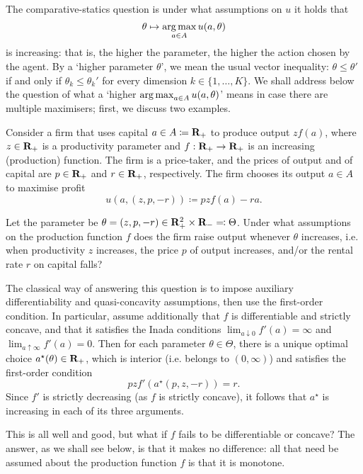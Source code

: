 The comparative-statics question is under what assumptions on $u$ it holds that
%
\begin{equation*}
	\theta \mapsto \operatorname*{arg\,max}_{a \in A} u(a,\theta)
\end{equation*}
%
is increasing: that is, the higher the parameter, the higher the action chosen by the agent. By a `higher parameter $\theta$', we mean the usual vector inequality: $\theta \leq \theta'$ if and only if $\theta_k \leq \theta_k'$ for every dimension $k \in \{1,\dots,K\}$. We shall address below the question of what a `higher $\operatorname*{arg\,max}_{a \in A} u(a,\theta)$' means in case there are multiple maximisers; first, we discuss two examples.

\begin{example}
	\label{example:prod}
	Consider a firm that uses capital $a \in A \coloneqq \mathbf{R}_+$ to produce output $z f(a)$, where $z \in \mathbf{R}_+$ is a productivity parameter and $f : \mathbf{R}_+ \to \mathbf{R}_+$ is an increasing (production) function. The firm is a price-taker, and the prices of output and of capital are $p \in \mathbf{R}_+$ and $r \in \mathbf{R}_+$, respectively. The firm chooses its output $a \in A$ to maximise profit
	\begin{equation*}
		u(a,(z,p,-r)) \coloneqq pzf(a) - ra .
	\end{equation*}
	
	Let the parameter be $\theta = (z,p,-r) \in \mathbf{R}_+^2 \times \mathbf{R}_- \eqqcolon \Theta$. Under what assumptions on the production function $f$ does the firm raise output whenever $\theta$ increases, i.e. when productivity $z$ increases, the price $p$ of output increases, and/or the rental rate $r$ on capital falls?
	
	The classical way of answering this question is to impose auxiliary differentiability and quasi-concavity assumptions, then use the first-order condition. In particular, assume additionally that $f$ is differentiable and strictly concave, and that it satisfies the Inada conditions $\lim_{a \downarrow 0} f'(a) = \infty$ and $\lim_{a \uparrow \infty} f'(a) = 0$. Then for each parameter $\theta \in \Theta$, there is a unique optimal choice $a^\star(\theta) \in \mathbf{R}_+$, which is interior (i.e. belongs to $(0,\infty)$) and satisfies the first-order condition
	\begin{equation*}
		pzf'\left(a^\star(p,z,-r)\right) = r .
	\end{equation*}
	Since $f'$ is strictly decreasing (as $f$ is strictly concave), it follows that $a^\star$ is increasing in each of its three arguments.

	This is all well and good, but what if $f$ fails to be differentiable or concave? The answer, as we shall see below, is that it makes no difference: all that need be assumed about the production function $f$ is that it is monotone.
\end{example}

